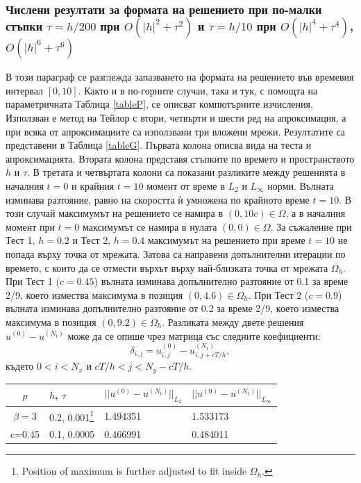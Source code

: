 \documentclass[a4paper]{article}
\newcommand{\be}{\begin{equation}}
\newcommand{\ee}{\end{equation}}
\theoremstyle{remark}
\begin{document}
\begin{large}
\subsubsection{Числени резултати за формата на решението при по-малки стъпки $\tau = h/200$ при $O(|h|^2 + \tau^2)$ и $\tau = h/10$ при $O(|h|^4 + \tau^4)$, $O(|h|^6 + \tau^6)$}
В този параграф се разглежда запазването на формата на решението във времевия интервал $[0, 10]$. Както и в по-горните случаи, така и тук, с помощта на параметричната Таблица \ref{tableP}, се описват компютърните изчисления. Използван е метод на Тейлор с втори, четвърти и шести ред на апроксимация, а при всяка от апроксимациите са използвани три вложени мрежи. Резултатите са представени в Таблица \ref{tableG}. Първата колона описва вида на теста и апроксимацията. Втората колона представя стъпките по времето и пространството $h$ и $\tau$. В третата и четвъртата колони са показани разликите между решенията в началния $t=0$ и крайния  $t=10$ момент от време в  $L_2$ и $L_\infty$ норми. Вълната изминава разтояние, равно на скоростта ѝ умножена по крайното време $t=10$. В този случай максимумът на решението се намира в $(0, 10 c) \in \Omega$, а в началния момент при $t=0$ максимумът се намира в нулата $(0, 0) \in \Omega$. За съжаление при Тест 1, $h=0.2$ и Тест 2, $h=0.4$ максимумът на решението при време $t=10$ не попада върху точка от мрежата. Затова са направени допълнителни итерации по времето, с които да се отмести върхът върху най-близката точка от мрежата $\Omega_h$. При Тест 1 ($c=0.45$) вълната изминава допълнително разтояние от 0.1 за време 2/9, което измества максимума в позиция $(0, 4.6) \in \Omega_h$. При Тест 2 ($c=0.9$) вълната изминава допълнително разтояние от 0.2 за време 2/9, което измества максимума в позиция $(0, 9.2) \in \Omega_h$. Разликата между двете решения $u^{(0)} - u^{(N_t)}$ може да се опише чрез матрица със следните коефициенти:
\be\label{st_end_diff}
 \delta_{i,j} = u_{i,j}^{(0)} - u_{i,j+cT/h}^{(N_t)},
\ee
където $0 < i < N_x$ и $cT/h < j < N_y - cT/h$. 
\begin{table}[ht]
\centering
\small
		\begin{tabular}{||c|l|l|l||}
			\hline
			\hline
        $p$       & $h$, $\tau$  & $||u^{(0)} - u^{(N_t)}||_{L_2}$  & $||u^{(0)} - u^{(N_t)}||_{L_\infty}$   \\
   		\hline 
			\hline
  $\beta=3$                &0.2, 0.001\footnote{Position of maximum is further adjusted to fit inside $\Omega_h$.}            & 1.494351 & 1.533173    \\
   c=0.45                     &0.1, 0.0005          & 0.466991 & 0.484011       \\

\end{tabular}
\end{table}
\end{large}
\end{document}
